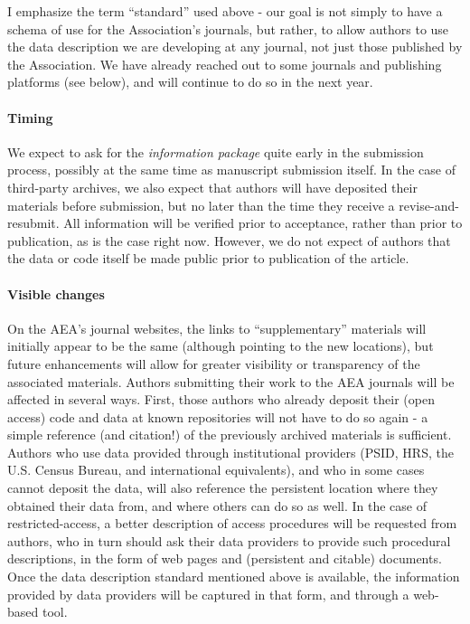 \documentclass[AEJ]{AEA}
\begin{document}
I emphasize the term ``standard'' used above - our goal is not simply to have a schema of use for the Association's journals, but rather, to allow authors to use the data description we are developing at any journal, not just those published by the Association. We have already reached out to some journals and publishing platforms (see below), and will continue to do so in the next year. 

\paragraph{Timing}
We expect to ask for the \textit{information package} quite early in the submission process, possibly at the same time as manuscript submission itself. In the case of third-party archives, we also expect that authors will have deposited their materials before submission, but no later than the time they receive a revise-and-resubmit. All information will be verified prior to acceptance, rather than prior to publication, as is the case right now. However, we do not expect of authors that the data or code itself be made public prior to publication of the article. 


\paragraph{Visible changes} 
On the AEA's journal websites, the links to ``supplementary'' materials will initially appear to be the same (although pointing to the new locations), but future enhancements will allow for greater visibility or transparency of the associated materials. 
%
Authors submitting their work to the AEA journals will be affected in several ways. First, those authors who already deposit their (open access) code and data at known repositories will not have to do so again - a simple reference (and citation!) of the previously archived materials is sufficient. Authors who use data provided through institutional providers (\ac{PSID}, \ac{HRS}, the U.S. Census Bureau, and international equivalents), and who in some cases cannot deposit the data, will also reference the persistent location where they obtained their data from, and where others can do so as well. In the case of restricted-access, a better description of access procedures will be requested from authors, who in turn should ask their data providers to provide such procedural descriptions, in the form of web pages and (persistent and citable) documents. Once the data description standard mentioned above is available, the information provided by data providers will be captured in that form, and through a web-based tool. 
\end{document}
